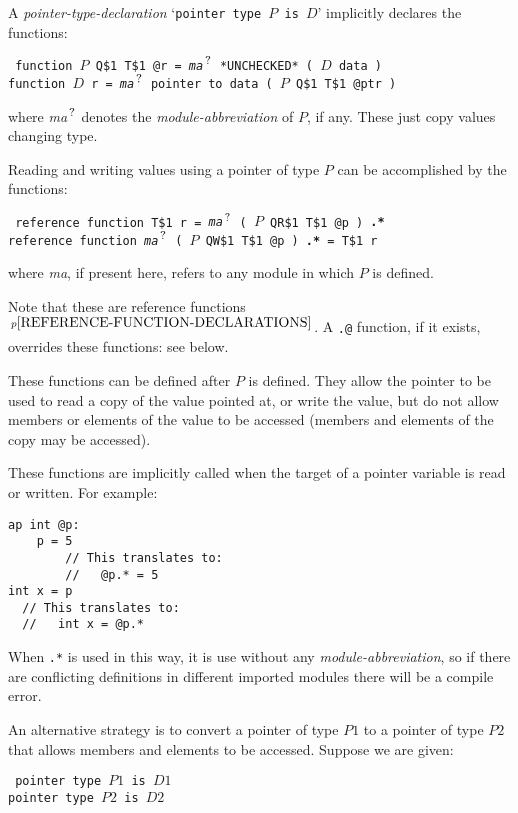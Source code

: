 \documentclass[12pt]{article}
\newcommand{\QMARK}{{$^{\,\mbox{\footnotesize ?}}$}}
\newcommand{\ttkey}[1]{{\tt \bfseries #1}}
\newcommand{\pagnote}[1]{$\,^{p\pageref{#1}}$}
\newenvironment{indpar}[1][0.3in]%
	{\begin{list}{}%
		     {\setlength{\itemsep}{0in}%
		      \setlength{\topsep}{0in}%
		      \setlength{\parsep}{1ex}%
		      \setlength{\labelwidth}{#1}%
		      \setlength{\leftmargin}{#1}%
		      \addtolength{\leftmargin}{\labelsep}}%
	 \item}%
	{\end{list}}
\begin{document}
A {\em pointer-type-declaration} `{\tt pointer type $P$ is $D$}'
implicitly declares the functions:
\begin{indpar} \tt
function $P$ Q\$1 T\$1 @r = {\em ma}\QMARK{} *UNCHECKED* ( $D$ data ) \\
function $D$ r = {\em ma}\QMARK{} pointer to data ( $P$ Q\$1 T\$1 @ptr )
\end{indpar}
where {\em ma}\QMARK{} denotes the {\em module-abbreviation} of $P$,
if any.
These just copy values changing type.

Reading and writing values using a pointer of type $P$
can be accomplished by the functions:

\begin{indpar}[1ex] \tt
reference function T\$1 r =
    {\em ma}\QMARK{} ( $P$ QR\$1 T\$1 @p ) \ttkey{.*} \\
reference function {\em ma}\QMARK{} ( $P$ QW\$1 T\$1 @p ) \ttkey{.*} =
    T\$1 r
\end{indpar}
where {\em ma}, if present here, refers to any module in which $P$ is defined.

Note that these are reference
functions\pagnote{REFERENCE-FUNCTION-DECLARATIONS}.
A {\tt .@} function, if it exists,
overrides these functions: see below.

These functions can be defined after $P$ is defined.
They allow the pointer to be used to read a copy of the
value pointed at, or write the value, but do not allow
members or elements of the value to be accessed
(members and elements of the copy may be accessed).

These functions are implicitly called when the target
of a pointer variable is read or written.  For example:
\begin{indpar}\begin{verbatim}
ap int @p:
    p = 5
        // This translates to:
        //   @p.* = 5
int x = p
  // This translates to:
  //   int x = @p.*
\end{verbatim}\end{indpar}

When {\tt .*} is used in this way, it is use without any
{\em module-abbreviation}, so if there are conflicting
definitions in different imported
modules there will be a compile error.

An alternative strategy is to convert a pointer of type $P1$
to a pointer of type $P2$ that allows members and elements
to be accessed.  Suppose we are given:
\begin{indpar} \tt
pointer type $P1$ is $D1$ \\
pointer type $P2$ is $D2$
\end{indpar}
\end{document}
